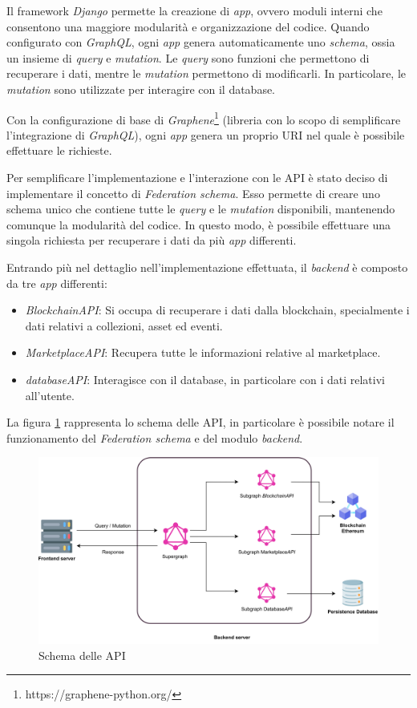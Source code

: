 Il framework \textit{Django} permette la creazione di \textit{app}, ovvero moduli interni che consentono una maggiore modularità e organizzazione del codice. Quando configurato con \textit{GraphQL}, ogni \textit{app} genera automaticamente uno \textit{schema}, ossia un insieme di \textit{query} e \textit{mutation}. Le \textit{query} sono funzioni che permettono di recuperare i dati, mentre le \textit{mutation} permettono di modificarli. In particolare, le \textit{mutation} sono utilizzate per interagire con il database.

Con la configurazione di base di \textit{Graphene}\footnote{https://graphene-python.org/} (libreria con lo scopo di semplificare l'integrazione di \textit{GraphQL}), ogni \textit{app} genera un proprio URI nel quale è possibile effettuare le richieste. 

Per semplificare l'implementazione e l'interazione con le API è stato deciso di implementare il concetto di \textit{Federation schema}. Esso permette di creare uno schema unico che contiene tutte le \textit{query} e le \textit{mutation} disponibili, mantenendo comunque la modularità del codice. In questo modo, è possibile effettuare una singola richiesta per recuperare i dati da più \textit{app} differenti.

Entrando più nel dettaglio nell'implementazione effettuata, il \textit{backend} è composto da tre \textit{app} differenti:

\begin{itemize}
    \item \textit{BlockchainAPI}: Si occupa di recuperare i dati dalla blockchain, specialmente i dati relativi a collezioni, asset ed eventi.
    \item \textit{MarketplaceAPI}: Recupera tutte le informazioni relative al marketplace.
    \item \textit{databaseAPI}: Interagisce con il database, in particolare con i dati relativi all'utente.
\end{itemize}

La figura \ref{fig:federationSchema} rappresenta lo schema delle API, in particolare è possibile notare il funzionamento del \textit{Federation schema} e del modulo \textit{backend}.

\begin{figure}[H]
    \centering
    \includegraphics[width=1\textwidth]{images/GraphQLFederationSchema.png}
    \caption{Schema delle API}
    \label{fig:federationSchema}
\end{figure}

